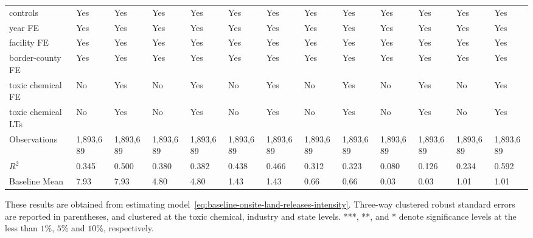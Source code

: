 \begin{table}[H]
{\begin{tabular}{@{}lllllllllllll@{}}
            controls           & Yes       & Yes       & Yes       & Yes       & Yes       & Yes       & Yes       & Yes       & Yes       & Yes       & Yes       & Yes       \\
            year FE            & Yes       & Yes       & Yes       & Yes       & Yes       & Yes       & Yes       & Yes       & Yes       & Yes       & Yes       & Yes       \\
            facility FE        & Yes       & Yes       & Yes       & Yes       & Yes       & Yes       & Yes       & Yes       & Yes       & Yes       & Yes       & Yes       \\
            border-county FE   & Yes       & Yes       & Yes       & Yes       & Yes       & Yes       & Yes       & Yes       & Yes       & Yes       & Yes       & Yes       \\
            toxic chemical FE  & No        & Yes       & No        & Yes       & No        & Yes       & No        & Yes       & No        & Yes       & No        & Yes       \\
            toxic chemical LTs & No        & Yes       & No        & Yes       & No        & Yes       & No        & Yes       & No        & Yes       & No        & Yes       \\\midrule
            Observations       & 1,893,689 & 1,893,689 & 1,893,689 & 1,893,689 & 1,893,689 & 1,893,689 & 1,893,689 & 1,893,689 & 1,893,689 & 1,893,689 & 1,893,689 & 1,893,689 \\
            $R^2$              & 0.345     & 0.500     & 0.380     & 0.382     & 0.438     & 0.466     & 0.312     & 0.323     & 0.080     & 0.126     & 0.234     & 0.592     \\
            Baseline Mean      & 7.93      & 7.93      & 4.80      & 4.80      & 1.43      & 1.43      & 0.66      & 0.66      & 0.03      & 0.03      & 1.01      & 1.01      \\ \bottomrule\bottomrule
        \end{tabular}%
    }
    \begin{minipage}{\columnwidth}
        \vspace{0.05in}
        These results are obtained from estimating model~\ref{eq:baseline-onsite-land-releases-intensity}. Three-way clustered robust standard errors are reported in parentheses, and clustered at the toxic chemical, industry and state levels. ***, **, and * denote significance levels at the less than $1\%$, $5\%$ and $10\%$, respectively.
    \end{minipage}
\end{table}